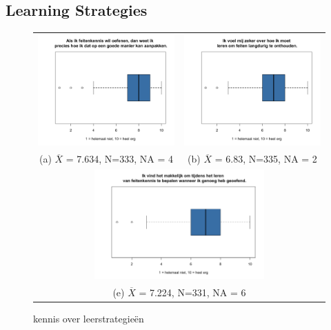 \documentclass[12pt, a4paper]{article}
\begin{document}
{{\subsection{Learning Strategies}
\begin{figure}
    \begin{tabular}{cc}
      \includegraphics[width=65mm]{04-WeetAanpakken.png} &   \includegraphics[width=65mm]{06-zekerOverOnthouden.png} \\
    (a)  $\overline{X}$ = 7.634, N=333, NA = 4 & (b) $\overline{X}$ =  6.83, N=335, NA = 2 \\[6pt]
    \multicolumn{2}{c}{\includegraphics[width=65mm]{05-bepalenGenoegGeoefend.png} }\\
    \multicolumn{2}{c}{(e) $\overline{X}$ = 7.224, N=331, NA = 6}
    \end{tabular}
    \caption{kennis over leerstrategieën}
    \label{fig:leerstrategie}
    \end{figure}

}}
\end{document}
